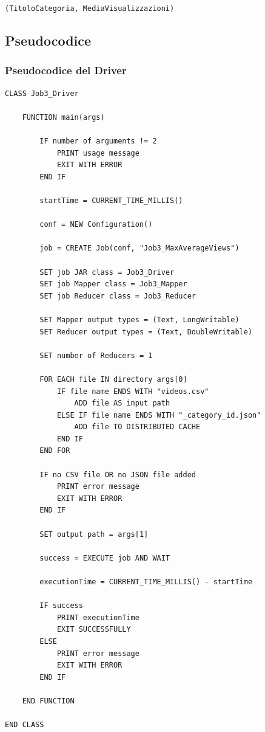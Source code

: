 \documentclass[12pt, a4paper]{article}
\begin{document}
\begin{center}
    \texttt{(TitoloCategoria, MediaVisualizzazioni)}
\end{center}

\subsection{Pseudocodice}

\subsubsection{Pseudocodice del Driver}

\begin{verbatim}
CLASS Job3_Driver

    FUNCTION main(args)

        IF number of arguments != 2
            PRINT usage message
            EXIT WITH ERROR
        END IF

        startTime = CURRENT_TIME_MILLIS()

        conf = NEW Configuration()

        job = CREATE Job(conf, "Job3_MaxAverageViews")

        SET job JAR class = Job3_Driver
        SET job Mapper class = Job3_Mapper
        SET job Reducer class = Job3_Reducer

        SET Mapper output types = (Text, LongWritable)
        SET Reducer output types = (Text, DoubleWritable)

        SET number of Reducers = 1

        FOR EACH file IN directory args[0]
            IF file name ENDS WITH "videos.csv"
                ADD file AS input path
            ELSE IF file name ENDS WITH "_category_id.json"
                ADD file TO DISTRIBUTED CACHE
            END IF
        END FOR

        IF no CSV file OR no JSON file added
            PRINT error message
            EXIT WITH ERROR
        END IF

        SET output path = args[1]

        success = EXECUTE job AND WAIT

        executionTime = CURRENT_TIME_MILLIS() - startTime

        IF success
            PRINT executionTime
            EXIT SUCCESSFULLY
        ELSE
            PRINT error message
            EXIT WITH ERROR
        END IF

    END FUNCTION

END CLASS
\end{verbatim}
\end{document}
